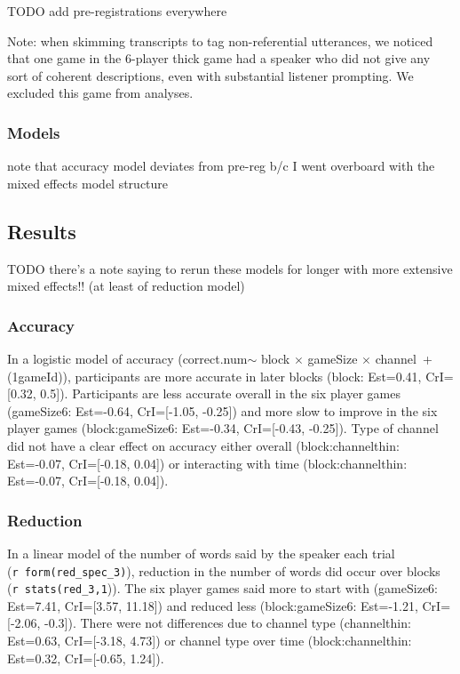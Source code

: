 \documentclass[
  english,
  a4paper,
]{article}
\begin{document}
TODO add pre-registrations everywhere

Note: when skimming transcripts to tag non-referential utterances, we noticed that one game in the 6-player thick game had a speaker who did not give any sort of coherent descriptions, even with substantial listener prompting. We excluded this game from analyses.

\hypertarget{models}{%
\subsubsection{Models}\label{models}}

note that accuracy model deviates from pre-reg b/c I went overboard with the mixed effects model structure

\hypertarget{results-2}{%
\subsection{Results}\label{results-2}}

TODO there's a note saying to rerun these models for longer with more extensive mixed effects!! (at least of reduction model)

\hypertarget{accuracy-2}{%
\subsubsection{Accuracy}\label{accuracy-2}}

In a logistic model of accuracy (correct.num\(\sim\) block \(\times\) gameSize \(\times\) channel~+ (1\textbar gameId)), participants are more accurate in later blocks (block: Est=0.41, CrI={[}0.32, 0.5{]}). Participants are less accurate overall in the six player games (gameSize6: Est=-0.64, CrI={[}-1.05, -0.25{]}) and more slow to improve in the six player games (block:gameSize6: Est=-0.34, CrI={[}-0.43, -0.25{]}). Type of channel did not have a clear effect on accuracy either overall (block:channelthin: Est=-0.07, CrI={[}-0.18, 0.04{]}) or interacting with time (block:channelthin: Est=-0.07, CrI={[}-0.18, 0.04{]}).

\hypertarget{reduction-2}{%
\subsubsection{Reduction}\label{reduction-2}}

In a linear model of the number of words said by the speaker each trial (\texttt{r\ form(red\_spec\_3)}), reduction in the number of words did occur over blocks (\texttt{r\ stats(red\_3,1})). The six player games said more to start with (gameSize6: Est=7.41, CrI={[}3.57, 11.18{]}) and reduced less (block:gameSize6: Est=-1.21, CrI={[}-2.06, -0.3{]}). There were not differences due to channel type (channelthin: Est=0.63, CrI={[}-3.18, 4.73{]}) or channel type over time (block:channelthin: Est=0.32, CrI={[}-0.65, 1.24{]}).
\end{document}
